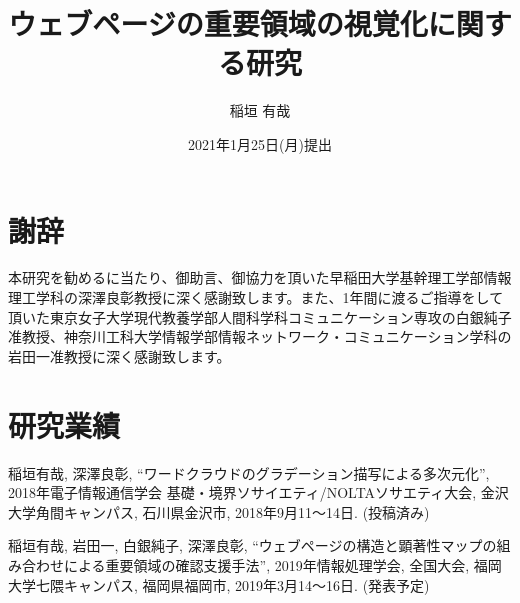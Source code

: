 \documentclass[a4j, 12pt]{jsarticle}
\title{ウェブページの重要領域の視覚化に関する研究}
\date{2021年1月25日(月)提出}
\author{稲垣 有哉}
\begin{document}
\pagestyle{empty}
\maketitle

\setcounter{page}{1}
\pagestyle{plain}
\setcounter{tocdepth}{3} %
\tableofcontents

\newpage
{}
\setcounter{page}{1} %
\pagestyle{fancy}









\newpage
\renewcommand{\baselinestretch}{1.5}
\section*{謝辞}
\par 本研究を勧めるに当たり、御助言、御協力を頂いた早稲田大学基幹理工学部情報理工学科の深澤良彰教授に深く感謝致します。また、1年間に渡るご指導をして頂いた東京女子大学現代教養学部人間科学科コミュニケーション専攻の白銀純子准教授、神奈川工科大学情報学部情報ネットワーク・コミュニケーション学科の岩田一准教授に深く感謝致します。

\newpage



\newpage
\section*{研究業績}
\par 稲垣有哉, 深澤良彰, “ワードクラウドのグラデーション描写による多次元化”, 2018年電子情報通信学会 基礎・境界ソサイエティ/NOLTAソサエティ大会, 金沢大学角間キャンパス, 石川県金沢市, 2018年9月11～14日. (投稿済み)\\
\par 稲垣有哉, 岩田一, 白銀純子, 深澤良彰, “ウェブページの構造と顕著性マップの組み合わせによる重要領域の確認支援手法”, 2019年情報処理学会, 全国大会, 福岡大学七隈キャンパス, 福岡県福岡市, 2019年3月14～16日. (発表予定)

\end{document}
